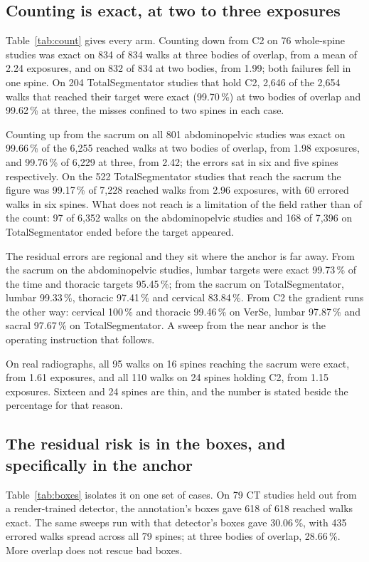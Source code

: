 \documentclass[11pt,letterpaper]{article}
\begin{document}
\subsection*{Counting is exact, at two to three exposures}
Table~\ref{tab:count} gives every arm. Counting down from C2 on 76 whole-spine studies was exact on 834 of
834 walks at three bodies of overlap, from a mean of 2.24 exposures, and on 832 of 834 at two bodies, from
1.99; both failures fell in one spine. On 204 TotalSegmentator studies that hold C2, 2{,}646 of the 2{,}654
walks that reached their target were exact (99.70\,\%) at two bodies of overlap and 99.62\,\% at three, the
misses confined to two spines in each case.

Counting up from the sacrum on all 801 abdominopelvic studies was exact on 99.66\,\% of the 6{,}255 reached
walks at two bodies of overlap, from 1.98 exposures, and 99.76\,\% of 6{,}229 at three, from 2.42; the
errors sat in six and five spines respectively. On the 522 TotalSegmentator studies that reach the sacrum
the figure was 99.17\,\% of 7{,}228 reached walks from 2.96 exposures, with 60 errored walks in six spines.
What does not reach is a limitation of the field rather than of the count: 97 of 6{,}352 walks on the
abdominopelvic studies and 168 of 7{,}396 on TotalSegmentator ended before the target appeared.

The residual errors are regional and they sit where the anchor is far away. From the sacrum on the
abdominopelvic studies, lumbar targets were exact 99.73\,\% of the time and thoracic targets 95.45\,\%; from
the sacrum on TotalSegmentator, lumbar 99.33\,\%, thoracic 97.41\,\% and cervical 83.84\,\%. From C2 the
gradient runs the other way: cervical 100\,\% and thoracic 99.46\,\% on VerSe, lumbar 97.87\,\% and sacral
97.67\,\% on TotalSegmentator. A sweep from the near anchor is the operating instruction that follows.

On real radiographs, all 95 walks on 16 spines reaching the sacrum were exact, from 1.61 exposures, and all
110 walks on 24 spines holding C2, from 1.15 exposures. Sixteen and 24 spines are thin, and the number is
stated beside the percentage for that reason.

\subsection*{The residual risk is in the boxes, and specifically in the anchor}
Table~\ref{tab:boxes} isolates it on one set of cases. On 79 CT studies held out from a render-trained
detector, the annotation's boxes gave 618 of 618 reached walks exact. The same sweeps run with that
detector's boxes gave 30.06\,\%, with 435 errored walks spread across all 79 spines; at three bodies of
overlap, 28.66\,\%. More overlap does not rescue bad boxes.
\end{document}
